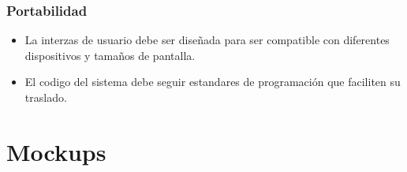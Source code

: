 \documentclass[12pt,a4paper, twosite]{article}
\begin{document}
\subsubsection{Portabilidad}
\begin{itemize}
\item La interzas de usuario debe ser diseñada para ser compatible con diferentes dispositivos y tamaños de pantalla. 
\item El codigo del sistema debe seguir estandares de programación que faciliten su traslado.
\end{itemize}
 

\newpage


\section{Mockups}
\label{sec:org75cea03}
\end{document}
